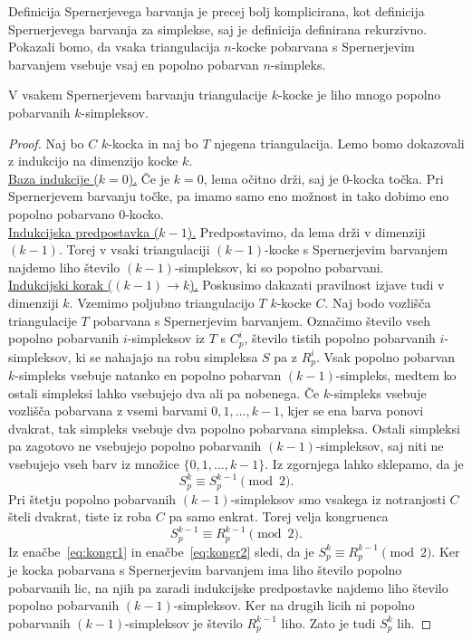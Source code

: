\documentclass[mat1]{fmfdelo}
\newcommand{\0}{\underline{0}}
\begin{document}
Definicija Spernerjevega barvanja je precej bolj komplicirana, kot definicija Spernerjevega barvanja za simplekse, saj je definicija \label{def:cubsperner} definirana rekurzivno.
Pokazali bomo, da vsaka triangulacija $n$-kocke pobarvana s Spernerjevim barvanjem vsebuje vsaj en popolno pobarvan $n$-simpleks.
\begin{lema}\label{izr:kubsperner}
V vsakem Spernerjevem barvanju triangulacije $k$-kocke je liho mnogo popolno pobarvanih $k$-simpleksov.
\end{lema}
\begin{proof}
Naj bo $C$ $k$-kocka in naj bo $T$ njegena triangulacija. Lemo bomo dokazovali z indukcijo na dimenzijo kocke $k$. \\
\underline{Baza indukcije ($k = 0$).}
Če je $k=0$, lema očitno drži, saj je $0$-kocka točka. Pri Spernerjevem barvanju točke, pa imamo samo eno možnost in tako dobimo eno popolno pobarvano $0$-kocko.\\
\underline{Indukcijska predpostavka ($k - 1$).}
Predpostavimo, da lema drži v dimenziji $(k - 1)$. Torej v vsaki triangulaciji $(k - 1)$-kocke s Spernerjevim barvanjem najdemo liho število $(k - 1)$-simpleksov, ki so popolno pobarvani. \\
\underline{Indukcijski korak ($(k - 1) \rightarrow k$).}
Poskusimo dakazati pravilnost izjave tudi v dimenziji $k$. Vzemimo poljubno triangulacijo $T$ $k$-kocke $C$. Naj bodo vozlišča triangulacije $T$ pobarvana s Spernerjevim barvanjem. Označimo število vseh popolno pobarvanih $i$-simpleksov iz $T$ s $C_p^i$, število tistih popolno pobarvanih $i$-simpleksov, ki se nahajajo na robu simpleksa $S$ pa z $R_p^i$. Vsak popolno pobarvan $k$-simpleks vsebuje natanko en popolno pobarvan $(k-1)$-simpleks, medtem ko ostali simpleksi lahko vsebujejo dva ali pa nobenega. Če $k$-simpleks vsebuje vozlišča pobarvana z vsemi barvami $0, 1, \dots, k-1$, kjer se ena barva ponovi dvakrat, tak simpleks vsebuje dva popolno pobarvana simpleksa. Ostali simpleksi pa zagotovo ne vsebujejo popolno pobarvanih $(k - 1)$-simpleksov, saj niti ne vsebujejo vseh barv iz množice $\{0, 1, \dots, k-1 \}$. Iz zgornjega lahko sklepamo, da je
\begin{equation}\label{eq:kongr1}
S_p^k \equiv S_p^{k-1} \pmod 2.
\end{equation}
Pri štetju popolno pobarvanih $(k - 1)$-simpleksov smo vsakega iz notranjosti $C$ šteli dvakrat, tiste iz roba $C$ pa samo enkrat. Torej velja kongruenca 
\begin{equation}\label{eq:kongr2}
S_p^{k-1} \equiv R_p^{k - 1} \pmod 2.
\end{equation}
Iz enačbe~\ref{eq:kongr1} in enačbe~\ref{eq:kongr2} sledi, da je $S_p^k \equiv R_p^{k - 1} \pmod 2$.
Ker je kocka pobarvana s Spernerjevim barvanjem ima liho število popolno pobarvanih lic, na njih pa zaradi indukcijske predpostavke najdemo liho število popolno pobarvanih $(k - 1)$-simpleksov. Ker na drugih licih ni popolno pobarvanih $(k - 1)$-simpleksov je število $R_p^{k - 1}$ liho. Zato je tudi $S_p^k$ lih.
\end{proof}
\end{document}
